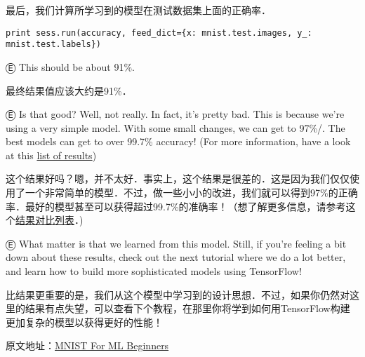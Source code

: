 最后，我们计算所学习到的模型在测试数据集上面的正确率．

\begin{lstlisting}
print sess.run(accuracy, feed_dict={x: mnist.test.images, y_: mnist.test.labels})
\end{lstlisting}

Ⓔ This should be about 91\%.

最终结果值应该大约是91\%．

Ⓔ Is that good? Well, not really. In fact, it's pretty bad. This is because we're using a very simple model. With some small changes, we can get to 97\%/. The best models can get to over 99.7\% accuracy! (For more information, have a look at this \href{http://rodrigob.github.io/are_we_there_yet/build/classification_datasets_results.html}{list of results})

这个结果好吗？嗯，并不太好．事实上，这个结果是很差的．这是因为我们仅仅使用了一个非常简单的模型．不过，做一些小小的改进，我们就可以得到97\%的正确率．最好的模型甚至可以获得超过99.7\%的准确率！（想了解更多信息，请参考这个\href{http://rodrigob.github.io/are_we_there_yet/build/classification_datasets_results.html}{结果对比列表}．)

Ⓔ What matter is that we learned from this model. Still, if you're feeling a bit down about these results, check out the next tutorial where we do a lot better, and learn how to build more sophisticated models using TensorFlow!

比结果更重要的是，我们从这个模型中学习到的设计思想．不过，如果你仍然对这里的结果有点失望，可以查看下个教程，在那里你将学到如何用TensorFlow构建更加复杂的模型以获得更好的性能！

原文地址：\href{http://tensorflow.org/tutorials/mnist/beginners/index.md}{MNIST For ML Beginners}
